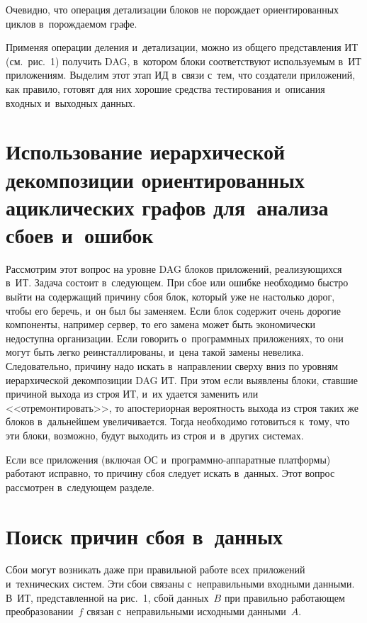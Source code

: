 \begin{multicols}{2}
   Очевидно, что операция детализации блоков не порождает ориентированных 
циклов в~по\-рож\-да\-емом графе. 

   Применяя операции деления и~детализации, можно из общего представления 
ИТ (см.\ рис.~1) получить DAG, в~котором блоки соответствуют используемым в~ИТ 
приложениям. Выделим этот этап ИД в~связи с~тем, что создатели приложений, 
как правило, готовят для них хорошие средства тестирования и~описания входных 
и~выходных данных. 
   
  \section{Использование иерархической декомпозиции ориентированных 
  ациклических графов 
для~анализа сбоев и~ошибок}
   
   Рассмотрим этот вопрос на уровне DAG блоков приложений, реализующихся 
в~ИТ. Задача состоит в~следующем. При сбое или ошибке необходимо быстро 
выйти на содержащий причину сбоя блок, который уже не настолько дорог, чтобы 
его беречь, и~он был бы заменяем. Если блок содержит очень дорогие 
компоненты, например сервер, то его замена может быть экономически 
недоступна организации. Если говорить о~программных приложениях, то они 
могут быть легко реинсталлированы, и~цена такой замены невелика. 
Следовательно, причину надо искать в~направлении сверху вниз по уровням 
иерархической декомпозиции DAG ИТ. При этом если выявлены блоки, ставшие 
причиной выхода из строя ИТ, и~их удается заменить или <<отремонтировать>>, 
то апостериорная вероятность выхода из строя таких же блоков в~дальнейшем 
увеличивается. Тогда необходимо готовиться к~тому, что эти блоки, возможно, 
будут выходить из строя и~в~других системах. 
   
   Если все приложения (включая ОС и~про\-граммно-аппаратные платформы) 
работают исправно, то причину сбоя следует искать в~данных. Этот вопрос 
рассмотрен в~следующем разделе. 
  
  \section{Поиск причин сбоя в~данных} 
  
  Сбои могут возникать даже при правильной работе всех приложений 
и~технических систем. Эти сбои связаны с~неправильными входными данными. 
В~ИТ, представленной на рис.~1, сбой данных~$B$ при правильно работающем 
преобразовании~$f$ связан с~неправильными исходными данными~$A$. 
  

\end{multicols}
